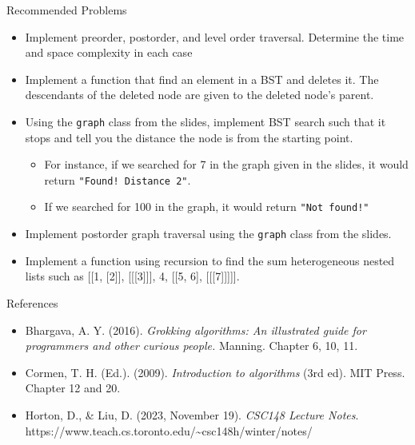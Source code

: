 \documentclass[
  ignorenonframetext,
]{beamer}
\begin{document}
\begin{frame}[fragile]{Recommended Problems}
\protect\hypertarget{recommended-problems-1}{}
\begin{itemize}
\item
  Implement preorder, postorder, and level order traversal. Determine
  the time and space complexity in each case
\item
  Implement a function that find an element in a BST and deletes it. The
  descendants of the deleted node are given to the deleted node's
  parent.
\item
  Using the \texttt{graph} class from the slides, implement BST search
  such that it stops and tell you the distance the node is from the
  starting point.

  \begin{itemize}
  \item
    For instance, if we searched for 7 in the graph given in the slides,
    it would return \texttt{"Found!\ Distance\ 2"}.
  \item
    If we searched for 100 in the graph, it would return
    \texttt{"Not\ found!"}
  \end{itemize}
\item
  Implement postorder graph traversal using the \texttt{graph} class
  from the slides.
\item
  Implement a function using recursion to find the sum heterogeneous
  nested lists such as {[}{[}1, {[}2{]}{]}, {[}{[}{[}3{]}{]}{]}, 4,
  {[}{[}5, 6{]}, {[}{[}{[}7{]}{]}{]}{]}{]}.
\end{itemize}
\end{frame}

\begin{frame}{References}
\protect\hypertarget{references}{}
\begin{itemize}
\item
  Bhargava, A. Y. (2016). \emph{Grokking algorithms: An illustrated
  guide for programmers and other curious people.} Manning. Chapter 6,
  10, 11.
\item
  Cormen, T. H. (Ed.). (2009). \emph{Introduction to algorithms} (3rd
  ed). MIT Press. Chapter 12 and 20.
\item
  Horton, D., \& Liu, D. (2023, November 19). \emph{CSC148 Lecture
  Notes}.
  https://www.teach.cs.toronto.edu/\textasciitilde csc148h/winter/notes/
\end{itemize}
\end{frame}
\end{document}
